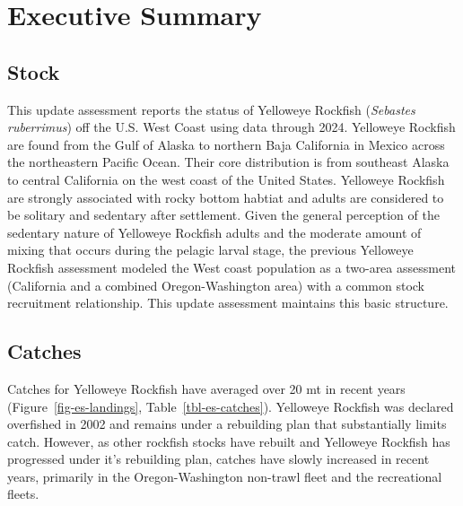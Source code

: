 \documentclass[
]{scrartcl}
\begin{document}
\newpage{}

\section*{Executive Summary}\label{executive-summary}

\subsection*{Stock}\label{stock}

This update assessment reports the status of Yelloweye Rockfish
(\emph{Sebastes ruberrimus}) off the U.S. West Coast using data through
2024. Yelloweye Rockfish are found from the Gulf of Alaska to northern
Baja California in Mexico across the northeastern Pacific Ocean. Their
core distribution is from southeast Alaska to central California on the
west coast of the United States. Yelloweye Rockfish are strongly
associated with rocky bottom habtiat and adults are considered to be
solitary and sedentary after settlement. Given the general perception of
the sedentary nature of Yelloweye Rockfish adults and the moderate
amount of mixing that occurs during the pelagic larval stage, the
previous Yelloweye Rockfish assessment modeled the West coast population
as a two-area assessment (California and a combined Oregon-Washington
area) with a common stock recruitment relationship. This update
assessment maintains this basic structure.

\subsection*{Catches}\label{catches}

Catches for Yelloweye Rockfish have averaged over 20 mt in recent years
(Figure~\ref{fig-es-landings}, Table~\ref{tbl-es-catches}). Yelloweye
Rockfish was declared overfished in 2002 and remains under a rebuilding
plan that substantially limits catch. However, as other rockfish stocks
have rebuilt and Yelloweye Rockfish has progressed under it's rebuilding
plan, catches have slowly increased in recent years, primarily in the
Oregon-Washington non-trawl fleet and the recreational fleets.
\end{document}
